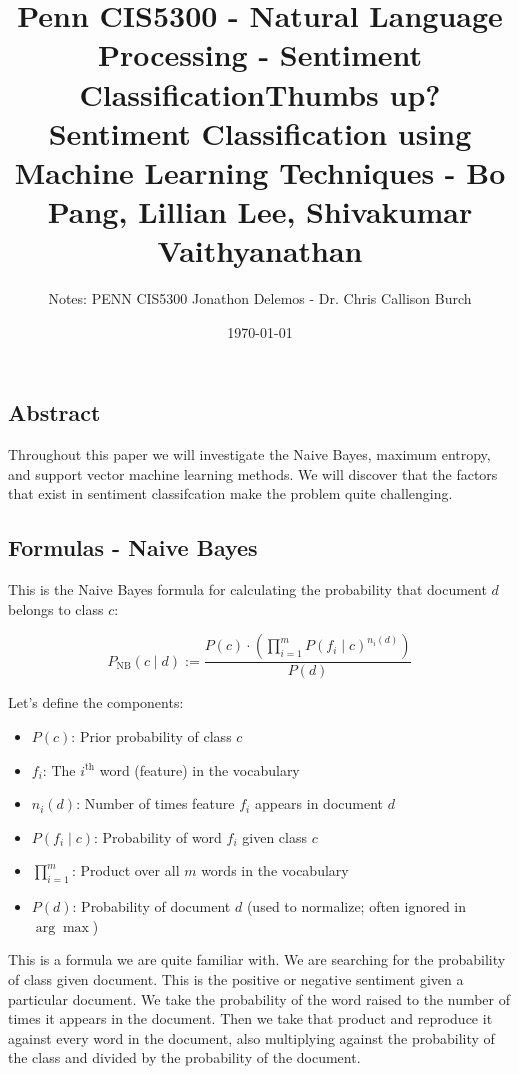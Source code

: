 \documentclass{article}
\title{Penn CIS5300 - Natural Language Processing - Sentiment Classification}
\title{Thumbs up? Sentiment Classification using Machine Learning
Techniques - Bo Pang, Lillian Lee, Shivakumar Vaithyanathan}
\author{Notes: PENN CIS5300 Jonathon Delemos - Dr. Chris Callison Burch}
\date{\today}
\begin{document}
\maketitle

\subsection{Abstract}

Throughout this paper we will investigate the Naive Bayes, maximum entropy, and support vector machine learning methods. We will discover that
the factors that exist in sentiment classifcation make the problem quite challenging.

\subsection{Formulas - Naive Bayes}

This is the Naive Bayes formula for calculating the probability that document $d$ belongs to class $c$:

\[
    P_{\text{NB}}(c \mid d) := \frac{P(c) \cdot \left( \prod_{i=1}^{m} P(f_i \mid c)^{n_i(d)} \right)}{P(d)}
\]

Let’s define the components:

\begin{itemize}
    \item $P(c)$: Prior probability of class $c$
    \item $f_i$: The $i^{\text{th}}$ word (feature) in the vocabulary
    \item $n_i(d)$: Number of times feature $f_i$ appears in document $d$
    \item $P(f_i \mid c)$: Probability of word $f_i$ given class $c$
    \item $\prod_{i=1}^{m}$: Product over all $m$ words in the vocabulary
    \item $P(d)$: Probability of document $d$ (used to normalize; often ignored in $\arg\max$)
\end{itemize}

This is a formula we are quite familiar with. We are searching for the probability of class given document. This is the positive or negative
sentiment given a particular document. We take the probability of the word raised to the number of times it appears in the document. Then we take that product and
reproduce it against every word in the document, also multiplying against the probability of the class and divided by the probability of the document.
\end{document}
